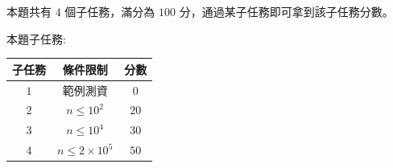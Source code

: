 \documentclass[11pt,a4paper]{article}
\begin{document}
本題共有 $4$ 個子任務，滿分為 $100$ 分，通過某子任務即可拿到該子任務分數。

本題子任務:

\begin{center}
    \begin{tabular}{||c c c||}
    \hline
    子任務 & 條件限制 & 分數 \\
    \hline
    $1$ & 範例測資 & $0$ \\
    \hline
    $2$ & $ n \leq 10^2$ & $20$  \\
    \hline
    $3$ & $ n \leq 10^4$ & $30$ \\
    \hline
	$4$ & $ n \leq 2\times 10^5$ & $50$ \\
	\hline
    \end{tabular}
\end{center}
\end{document}
